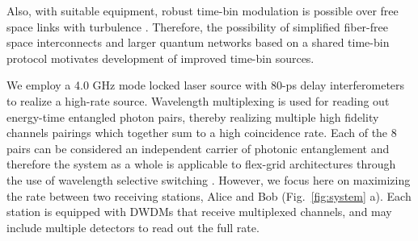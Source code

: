 \documentclass[11pt]{caltech_thesis} %
\begin{document}
Also, with suitable equipment, robust time-bin modulation is possible
over free space links with turbulence \autocite{Jin2019}. Therefore, the
possibility of simplified fiber-free space interconnects and larger
quantum networks based on a shared time-bin protocol motivates
development of improved time-bin sources.

We employ a 4.0 GHz mode locked laser source with 80-ps delay
interferometers to realize a high-rate source. Wavelength multiplexing
is used for reading out energy-time entangled photon pairs, thereby
realizing multiple high fidelity channels pairings which together sum to
a high coincidence rate. Each of the 8 pairs can be considered an
independent carrier of photonic entanglement \autocite{Wengerowsky2018}
and therefore the system as a whole is applicable to flex-grid
architectures through the use of wavelength selective switching
\autocite{Appas2021,Alshowkan22Switching}. However, we focus here on
maximizing the rate between two receiving stations, Alice and Bob
(Fig.~\ref{fig:system} a). Each station is equipped with DWDMs that
receive multiplexed channels, and may include multiple detectors to read
out the full rate.
\end{document}
